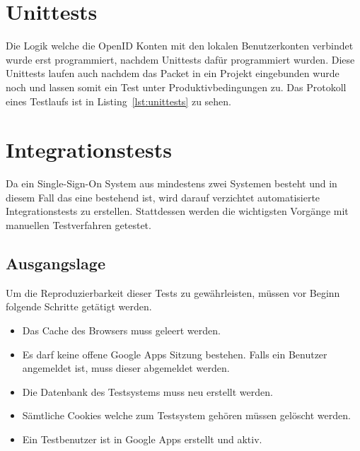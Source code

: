 
\section{Unittests}
\label{sec:unittests}
Die Logik welche die OpenID Konten mit den lokalen Benutzerkonten verbindet wurde erst programmiert, nachdem Unittests dafür programmiert wurden. Diese Unittests laufen auch nachdem das Packet in ein Projekt eingebunden wurde noch und lassen somit ein Test unter Produktivbedingungen zu. Das Protokoll eines Testlaufs ist in Listing~\ref{lst:unittests} zu sehen.

{\minipage{\linewidth}
  
\endminipage}

\section{Integrationstests}
\label{sec:integrationstests}
Da ein Single-Sign-On System aus mindestens zwei Systemen besteht und in diesem Fall das eine bestehend ist, wird darauf verzichtet automatisierte Integrationstests zu erstellen. Stattdessen werden die wichtigsten Vorgänge mit manuellen Testverfahren getestet.

\subsection{Ausgangslage}
\label{sub:TestingAusgangslage}
Um die Reproduzierbarkeit dieser Tests zu gewährleisten, müssen vor Beginn folgende Schritte getätigt werden.

\begin{itemize}
    \item Das Cache des Browsers muss geleert werden.
    \item Es darf keine offene Google Apps Sitzung bestehen. Falls ein Benutzer
          angemeldet ist, muss dieser abgemeldet werden.
    \item Die Datenbank des Testsystems muss neu erstellt werden.
    \item Sämtliche Cookies welche zum Testsystem gehören müssen gelöscht
          werden.
    \item Ein Testbenutzer ist in Google Apps erstellt und aktiv.
\end{itemize}

